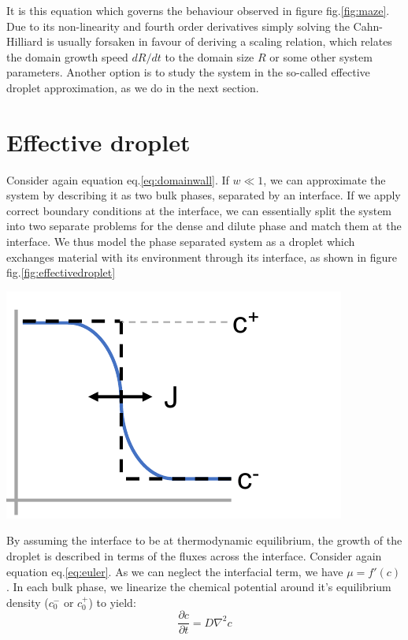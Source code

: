 \documentclass{Dissertate}
\let\origfigure\figure
\let\endorigfigure\endfigure
\renewenvironment{figure}[1][2] {
    \expandafter\origfigure\expandafter[H]
} {
    \endorigfigure
}
\begin{document}
It is this equation which governs the behaviour observed in figure
fig.\ref{fig:maze}. Due to its non-linearity and fourth order
derivatives simply solving the Cahn-Hilliard is usually forsaken in
favour of deriving a scaling relation, which relates the domain growth
speed \(dR/dt\) to the domain size \(R\) or some other system
parameters. Another option is to study the system in the so-called
effective droplet approximation, as we do in the next section.

\hypertarget{effective-droplet}{%
\section{Effective droplet}\label{effective-droplet}}

Consider again equation eq.\ref{eq:domainwall}. If \(w\ll1\), we can
approximate the system by describing it as two bulk phases, separated by
an interface. If we apply correct boundary conditions at the interface,
we can essentially split the system into two separate problems for the
dense and dilute phase and match them at the interface. We thus model
the phase separated system as a droplet which exchanges material with
its environment through its interface, as shown in figure
fig.\ref{fig:effectivedroplet}

\begin{figure}
\hypertarget{fig:effectivedroplet}{%
\centering
\includegraphics{source/figures/pdf/effectivedroplet.pdf}
\caption{Model of an effective droplet. Blue line is full Cahn-Hilliard,
black dashed line effective droplet.}\label{fig:effectivedroplet}
}
\end{figure}

By assuming the interface to be at thermodynamic equilibrium, the growth
of the droplet is described in terms of the fluxes across the interface.
Consider again equation eq.\ref{eq:euler}. As we can neglect the
interfacial term, we have \(\mu = f'(c)\). In each bulk phase, we
linearize the chemical potential around it's equilibrium density
(\(c_0^-\) or \(c_0^+\)) to yield: \begin{equation}
\frac{\partial c }{\partial t} = D\nabla^2c
\label{eq:diffusion}\end{equation}
\end{document}
